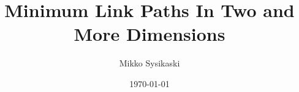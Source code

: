 \documentclass[english,gradu]{tktltiki2018}
\begin{document}
\newcommand\decomp[1]{\ensuremath{\textsc{dec}_{#1}}\xspace}
\newcommand\sweep[2]{\ensuremath{\textsc{sweep}_{#2}{(#1)}}\xspace}
\newcommand\stepof[1]{\ensuremath{\textsc{step}{(#1)}}\xspace}
\newcommand\proj[2]{\ensuremath{\text{proj}_{#1}(#2)}\xspace}

\newcommand\rotr[1]{\ensuremath{\top #1}\xspace}
\newcommand\vecof[1]{\ensuremath{\left [#1\right ]}\xspace}
\newcommand\sline[1]{\ensuremath{S_{#1}}\xspace}
\newcommand\intert[2]{\ensuremath{\textsc{interval}_{#1}(#2)}\xspace}
\newcommand\point[1]{\ensuremath{\left ({#1}\right )}\xspace}

\newcommand\cellevt{\ensuremath{\texttt{CellEvent}}\xspace}
\newcommand\obsevt{\ensuremath{\texttt{ObstacleEvent}}\xspace}
\newcommand\addrectevt{\ensuremath{\texttt{AddRectEvent}}\xspace}


\title{Minimum Link Paths In Two and More Dimensions}
\author{Mikko Sysikaski}
\date{\today}


\maketitle







\end{document}
